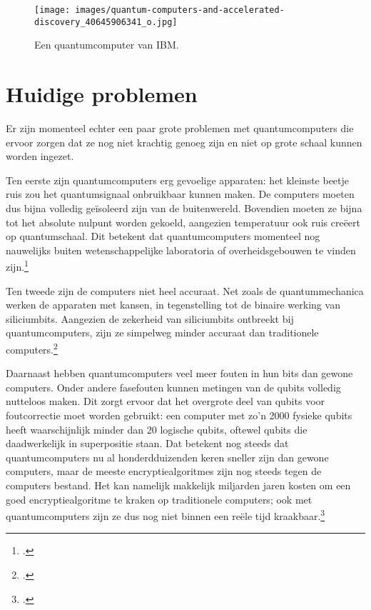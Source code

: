 \documentclass{report} %
\begin{document}
\begin{figure}[h!]
    \centering
    \texttt{[image: images/quantum-computers-and-accelerated-discovery\_40645906341\_o.jpg]}
    \caption[]{Een quantumcomputer van IBM.\protect \footnotemark} 
    \label{fig:quantum_comp}
\end{figure}

\section{Huidige problemen}
Er zijn momenteel echter een paar grote problemen met quantumcomputers die ervoor zorgen dat ze nog niet krachtig genoeg zijn en niet op grote schaal kunnen worden ingezet.
\par Ten eerste zijn quantumcomputers erg gevoelige apparaten: het kleinste beetje ruis zou het quantumsignaal onbruikbaar kunnen maken. De computers moeten dus bijna volledig geïsoleerd zijn van de buitenwereld. Bovendien moeten ze bijna tot het absolute nulpunt worden gekoeld, aangezien temperatuur ook ruis creëert op quantumschaal. Dit betekent dat quantumcomputers momenteel nog nauwelijks buiten wetenschappelijke laboratoria of overheidsgebouwen te vinden zijn.\footnote{\cite{cskirschquantum}.}
\par Ten tweede zijn de computers niet heel accuraat. Net zoals de quantummechanica werken de apparaten met kansen, in tegenstelling tot de binaire werking van siliciumbits. Aangezien de zekerheid van siliciumbits ontbreekt bij quantumcomputers, zijn ze simpelweg minder accuraat dan traditionele computers.\footnote{\cite{cskirschquantum}.}
\par Daarnaast hebben quantumcomputers veel meer fouten in hun bits dan gewone computers. Onder andere fasefouten kunnen metingen van de qubits volledig nutteloos maken. Dit zorgt ervoor dat het overgrote deel van qubits voor foutcorrectie moet worden gebruikt: een computer met zo’n 2000 fysieke qubits heeft waarschijnlijk minder dan 20 logische qubits, oftewel qubits die daadwerkelijk in superpositie staan. Dat betekent nog steeds dat quantumcomputers nu al honderdduizenden keren sneller zijn dan gewone computers, maar de meeste encryptiealgoritmes zijn nog steeds tegen de computers bestand. Het kan namelijk makkelijk miljarden jaren kosten om een goed encryptiealgoritme te kraken op traditionele computers; ook met quantumcomputers zijn ze dus nog niet binnen een reële tijd kraakbaar.\footnote{\cite{cskirschquantum}.}
\end{document}
